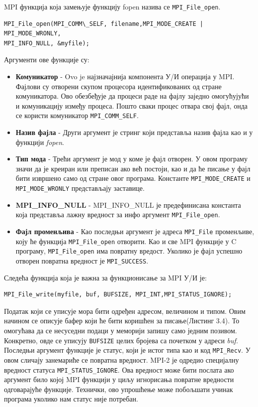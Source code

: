 MPI функција која замењује функцију fopen назива се \texttt{MPI\_File\_open}.

\begin{verbatim}
MPI_File_open(MPI_COMM\_SELF, filename,MPI_MODE_CREATE | MPI_MODE_WRONLY,
MPI_INFO_NULL, &myfile);
\end{verbatim}

Аргументи ове функције су:

\begin{itemize}
\item \textbf{Комуникатор} - Ovo je најзначајнија компонента У/И операција у MPI. Фајлови су отворени скупом процесора идентификованих од стране комуникатора. 
Ово обезбеђује да процеси раде на фајлу заједно омогућујући и комуникацију између процеса. 
Пошто сваки процес отвара свој фајл, онда се користи комуникатор \texttt{MPI\_COMM\_SELF}.

\item \textbf{Назив фајла} - Други аргумент је стринг који представља назив фајла као и у функцији \textit{fopen}.

\item \textbf{Тип мода} - Трећи аргумент је мод у коме је фајл отворен. У овом програму значи да је креиран или преписан ако већ постоји, као и да ће писање у фајл бити извршено само од стране овог програма. Константе  \texttt{MPI\_MODE\_CREATE} и \texttt{MPI\_MODE\_WRONLY} представљају заставице.

\item  \textbf{MPI\_INFO\_NULL} - MPI\_INFO\_NULL је предефинисана константа која представља лажну вредност за инфо аргумент \texttt{MPI\_File\_open}. 

\item \textbf{Фајл променљива} - Као последњи аргумент је адреса \texttt{MPI\_File} променљиве, коју ће функција \texttt{MPI\_File\_open} отворити. Као и све MPI функције у C програму, \texttt{MPI\_File\_open} има повратну вредост. Уколико је фајл успешно отворен повратна вредност је \texttt{MPI\_SUCCESS}.

\end{itemize}
 
Следећа функција која је важна за функционисање за MPI У/И је:

 \begin{verbatim}
MPI_File_write(myfile, buf, BUFSIZE, MPI_INT,MPI_STATUS_IGNORE);
\end{verbatim}

Податак који се уписује мора бити одређен адресом, величином и типом. Овим начином се описује бафер који ће бити коришћен за писање(Листинг 3.4). То омогућава да се несуседни подаци у меморији запишу само једним позивом. Конкретно, овде се уписују 
\texttt{BUFSIZE} целих бројева са почетком у адреси \textit{buf}. Последњи аргумент функције је статус, који је истог типа као и код \texttt{MPI\_Recv}.
У овом сличају занемариће се повратна вредност. MPI-2 је одредио специјалну вредност статуса \texttt{MPI\_STATUS\_IGNORE}. Ова вредност може бити послата ако аргумент било којој MPI функцији у циљу игнорисања повратне вредности одговарајуће функције.
Технички, ово упрошћење може побољшати учинак програма уколико нам статус није потребан.

